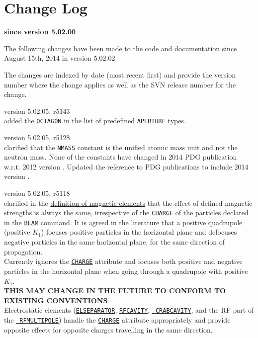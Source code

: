 \chapter{Change Log}
\label{chap:changelog}

\begin{center} 
\textbf{since version 5.02.00}
\end{center}

The following changes have been made to the code and documentation since
August 15th, 2014 in version 5.02.02

The changes are indexed by date (most recent first) and provide the \madx 
version number where the change applies as well as the SVN 
release number for the change. 

\begin{madlist}

   version 5.02.05, r5143\\
  added the {\tt OCTAGON} in the list of predefined 
  \hyperref[chap:aperture]{\tt APERTURE} types.
  
   version 5.02.05, r5128\\
  clarified that the {\tt NMASS} constant is the unified atomic mass 
  unit and not the neutron mass. None of the constants have changed in 2014 PDG 
  publication w.r.t. 2012 version \cite{PDG2012}. Updated the reference to PDG 
  publications to include 2014 version \cite{PDG2014}.

   version 5.02.05, r5118\\
  clarified in the \hyperref[chap:elements]{definition of magnetic elements} 
  that the effect of defined magnetic strengths is always the same, 
  irrespective of the \hyperref[sec:beam]{\tt CHARGE} of the particles declared 
  in the \hyperref[sec:beam]{\tt BEAM} command. It is agreed in the literature 
  that a positive quadrupole (positive $K_1$) focuses positive particles in the 
  horizontal plane and defocuses negative particles in the same horizontal 
  plane, for the same direction of propagation. \\ 
  Currently \mad ignores the \hyperref[sec:beam]{\tt CHARGE} attribute and 
  focuses both positive and negative particles in the horizontal plane when 
  going through a quadrupole with positive $K_1$. \\
  {\bf THIS MAY CHANGE IN THE FUTURE TO CONFORM TO EXISTING CONVENTIONS}\\
  Electrostatic elements (\hyperref[sec:elseparator]{\tt ELSEPARATOR}, 
  \hyperref[sec:rfcavity]{\tt RFCAVITY}, \hyperref[sec:crabcavity]{\tt 
  CRABCAVITY}, and the RF part of the \hyperref[sec:rfmultipole]{\tt 
  RFMULTIPOLE}) handle the \hyperref[sec:beam]{\tt CHARGE} attribute 
  appropriately and provide 
  opposite effects for opposite charges travelling in the same direction. 



\end{madlist}
